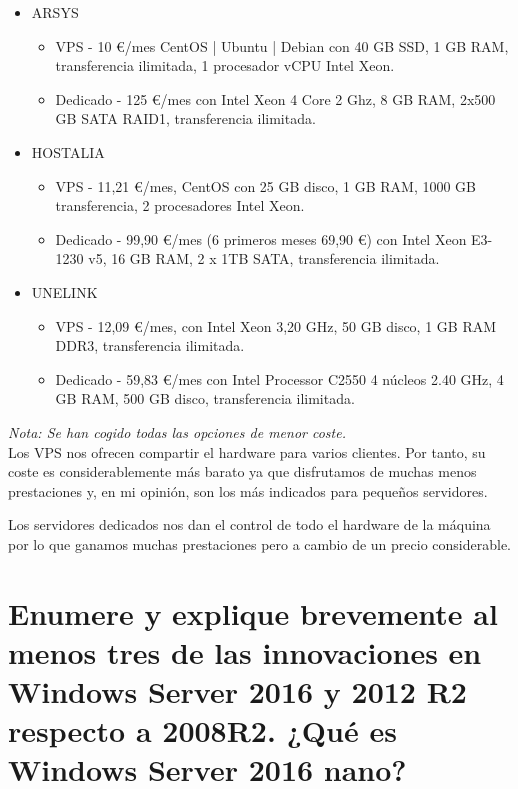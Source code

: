 \begin{itemize}
	\item ARSYS
	\begin{itemize}
		\item VPS - 10 \euro/mes CentOS | Ubuntu | Debian con 40 GB SSD, 1 GB RAM, transferencia ilimitada, 1 procesador vCPU Intel Xeon.\cite{c2-1}
		\item Dedicado - 125 \euro/mes con Intel Xeon 4 Core 2 Ghz, 8 GB RAM, 2x500 GB SATA RAID1, transferencia ilimitada.\cite{c2-2}
	\end{itemize}
	\item HOSTALIA
	\begin{itemize}
		\item VPS - 11,21 \euro/mes, CentOS con 25 GB disco, 1 GB RAM, 1000 GB transferencia,  2 procesadores Intel Xeon.\cite{c2-3}
		\item Dedicado - 99,90 \euro/mes (6 primeros meses 69,90 \euro) con Intel Xeon E3-1230 v5, 16 GB RAM, 2 x 1TB SATA, transferencia ilimitada.\cite{c2-4}
	\end{itemize}
	\item UNELINK
	\begin{itemize}
		\item VPS - 12,09 \euro/mes, con Intel Xeon 3,20 GHz, 50 GB disco, 1 GB RAM DDR3, transferencia ilimitada.\cite{c2-5}
		\item Dedicado - 59,83 \euro/mes con Intel Processor C2550 4 núcleos 2.40 GHz, 4 GB RAM, 500 GB disco, transferencia ilimitada.\cite{c2-6}
	\end{itemize}
\end{itemize}
\textit{Nota: Se han cogido todas las opciones de menor coste.}\\
Los VPS nos ofrecen compartir el hardware para varios clientes. Por tanto, su coste es considerablemente más barato ya que disfrutamos de muchas menos prestaciones y, en mi opinión, son los más indicados para pequeños servidores.

Los servidores dedicados nos dan el control de todo el hardware de la máquina por lo que ganamos muchas prestaciones pero a cambio de un precio considerable.

\section{Enumere y explique brevemente al menos tres de las innovaciones en Windows Server 2016 y 2012 R2 respecto a 2008R2. ¿Qué es Windows Server 2016 nano?}

